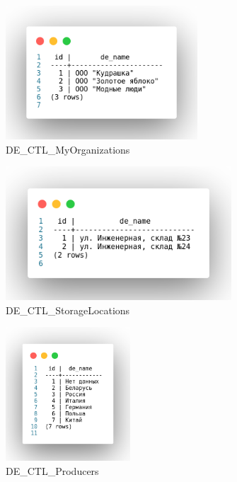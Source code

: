 \begin{figure}[!h]
    \centering

    \includegraphics[height=5cm]
    {assets/sql/DE_CTL_MyOrganizations.png}

    \caption{DE\_CTL\_MyOrganizations}

    \label{fig:CPR_MoiOrganizacii}
\end{figure}

\begin{figure}[!h]
    \centering

    \includegraphics[height=5cm]
    {assets/sql/DE_CTL_StorageLocations.png}

    \caption{DE\_CTL\_StorageLocations}

    \label{fig:CPR_MestaHraneniay}
\end{figure}

\begin{figure}[!h]
    \centering

    \includegraphics[height=5cm]
    {assets/sql/DE_CTL_Producers.png}

    \caption{DE\_CTL\_Producers}
    
    \label{fig:CPR_Proizvoditeli}
\end{figure}

